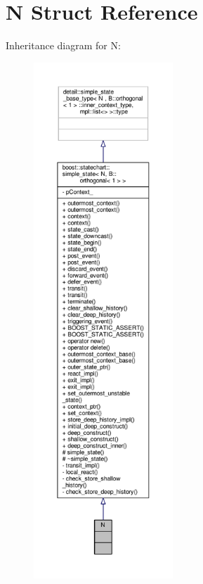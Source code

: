 \hypertarget{struct_n}{}\section{N Struct Reference}
\label{struct_n}


Inheritance diagram for N\+:
\nopagebreak
\begin{figure}[H]
\begin{center}
\leavevmode
\includegraphics[height=550pt]{struct_n__inherit__graph}
\end{center}
\end{figure}


